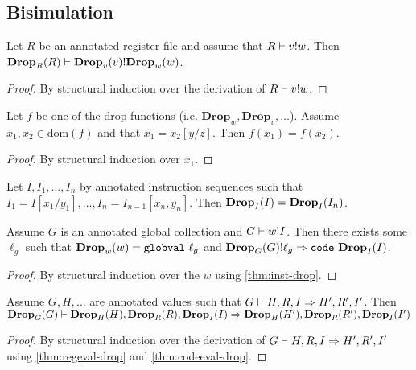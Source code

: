 \subsection{Bisimulation}

\begin{lemma}
  \label{thm:regeval-drop}
  Let $R$ be an annotated register file and assume that ${R} |- {v} ! {w}$. Then
  ${\mathbf{Drop}_{{R}}({R})} |- {\mathbf{Drop}_{{v}}({v})} ! {\mathbf{Drop}_{{w}}({w})}$.
\end{lemma}
\begin{proof}
  By structural induction over the derivation of ${R} |- {v} ! {w}$.
\end{proof}

\begin{lemma}
  Let $f$ be one of the drop-functions (i.e.
  $\mathbf{Drop}_w, \mathbf{Drop}_v, \dots$). Assume
  $x_1, x_2 \in \mathrm{dom}(f)$ and that $x_1 = x_2[y / z]$. Then
  $f(x_1) = f(x_2)$.
\end{lemma}
\begin{proof}
  By structural induction over $x_1$.
\end{proof}

\begin{corollary}
  \label{thm:inst-drop}
  Let $I, I_1, \dots, I_n$ by annotated instruction sequences such that
  $I_1 = I[x_1 / y_1], \dots, I_n = I_{n-1}[x_n, y_n]$. Then
  $\mathbf{Drop}_{{I}}({I}) = \mathbf{Drop}_{{I}}({I_n})$.
\end{corollary}

\begin{lemma}
  \label{thm:codeeval-drop}
  Assume $G$ is an annotated global collection and ${G} |- {w} ! {I}$. Then
  there exists some $\ell_g$ such that $\drop{w}{w} = \mathtt{globval}\ \ell_g$
  and $\lookup{\drop{G}{G}}{\ell_g}{\mathtt{code}\ \drop{I}{I}}$.
\end{lemma}
\begin{proof}
  By structural induction over the $w$ using \autoref{thm:inst-drop}.
\end{proof}

\begin{lemma}
  \label{thm:exec-drop}
  Assume $G, H, \dots$ are annotated values such that
  ${G} |- {H, R, I} => {H', R', I'}$. Then
  ${\mathbf{Drop}_{{G}}({G})} |- {\mathbf{Drop}_{{H}}({H}), \mathbf{Drop}_{{R}}({R}),
    \mathbf{Drop}_{{I}}({I})} => {\mathbf{Drop}_{{H}}({H'}), \mathbf{Drop}_{{R}}({R'}), \mathbf{Drop}_{{I}}({I'})}$
\end{lemma}
\begin{proof}
  By structural induction over the derivation of
  ${G} |- {H, R, I} => {H', R', I'}$ using \autoref{thm:regeval-drop}
  and \autoref{thm:codeeval-drop}.
\end{proof}

